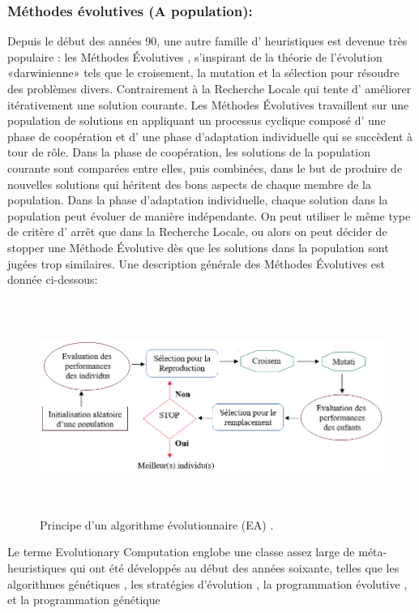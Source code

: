 \subsubsection{Méthodes évolutives (A population):}
Depuis le début des années 90, une autre famille d’ heuristiques est devenue très populaire : les Méthodes Évolutives \cite{hertz2000framework} , s’inspirant de la théorie de l’évolution «darwinienne»  tels que le croisement, la mutation et la sélection pour résoudre des problèmes divers. Contrairement à la Recherche Locale qui tente d’ améliorer itérativement une solution courante. Les Méthodes Évolutives travaillent sur une population de solutions en appliquant un processus cyclique composé d’ une phase de coopération et d’ une phase d’adaptation individuelle qui se succèdent à tour de rôle. Dans la phase de coopération, les solutions de la population courante sont comparées entre elles, puis combinées, dans le but de produire de nouvelles solutions qui héritent des bons aspects de chaque membre de la population. Dans la phase d’adaptation individuelle, chaque solution dans la population peut évoluer de manière indépendante. On peut utiliser le même type de critère d’ arrêt que dans la Recherche Locale, ou alors on peut décider de stopper une Méthode Évolutive dès que les solutions dans la population sont jugées trop similaires. Une description générale des Méthodes Évolutives est donnée ci-dessous:

\begin{figure}[H]
	\centering
	\includegraphics[width=15cm,height=7cm]{Chap2/5.png}
	\caption{Principe d’un algorithme évolutionnaire (EA) \cite{dreo2003metaheuristiques}.}
	\label{fig:PAEEA}
\end{figure}

Le terme Evolutionary Computation englobe une classe assez large de méta-heuristiques qui ont été développés au début des années soixante, telles que les algorithmes génétiques \cite{holland1975adaptation}, les stratégies d’évolution \cite{rechenberg1973evolutionsstrategie} , la programmation évolutive \cite{fogel1966artificial}, et la programmation génétique \cite{koza1992genetic}


